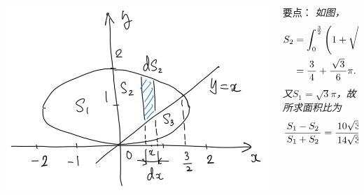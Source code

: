 \begin{frame}
	\linespread{1.5}
	\pause
	
	
	\begin{columns}
		\begin{column}{.45\textwidth}
			\begin{center}
				\includegraphics[width=.9\textwidth]{./images/ch6/ecXY.jpg}
			\end{center}		
		\end{column}
		\begin{column}{.55\textwidth}
			\small 要点：\it
			如图，
			\begin{align*}
				S_2&=\displaystyle\int_0^{\frac32}\left(1+\sqrt{1-\displaystyle\frac{\,{x^2}\,}{\,{3}\,}}-x\right)\mathrm{d} x\\
				&=\displaystyle\frac{\,{3}\,}{\,{4}\,}+\displaystyle\frac{\,{\sqrt3}\,}{\,{6}\,}\pi.
			\end{align*}
			又$S_1=\sqrt3\pi$，故所求面积比为
			$$\displaystyle\frac{\,{S_1-S_2}\,}{\,{S_1+S_2}\,}=\displaystyle\frac{\,{10\sqrt3\pi-9}\,}{\,{14\sqrt3\pi+9}\,}$$
		\end{column}
	\end{columns}
\end{frame}

